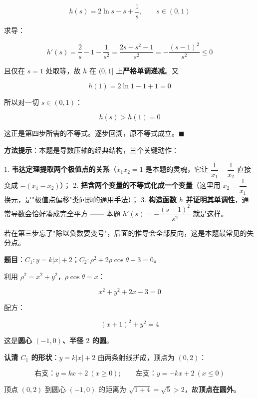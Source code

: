\[h(s)=2\ln s-s+\frac1s,\qquad s\in(0,1)\]

求导：

\[h'(s)=\frac2s-1-\frac1{s^{2}}=\frac{2s-s^{2}-1}{s^{2}}=-\frac{(s-1)^{2}}{s^{2}}\le0\]

且仅在 $s=1$ 处取等，故 $h$ 在 $(0,1]$ 上\textbf{严格单调递减}。又

\[h(1)=2\ln1-1+1=0\]

所以对一切 $s\in(0,1)$：

\[h(s)>h(1)=0\]

这正是第四步所需的不等式。逐步回溯，原不等式成立。$\blacksquare$

\begin{gktip}
\textbf{方法提示}：本题是导数压轴的经典结构，三个关键动作：

1. \textbf{韦达定理提取两个极值点的关系}（$x_1x_2=1$ 是本题的灵魂，它让 $\dfrac1{x_1}-\dfrac1{x_2}$ 直接变成 $-\left(x_1-x_2\right)$）；
2. \textbf{把含两个变量的不等式化成一个变量}（这里用 $x_2=\dfrac1{x_1}$ 换元，是"极值点偏移"类问题的通用手法）；
3. \textbf{构造函数 $h$ 并证明其单调性}，通常导数会恰好凑成完全平方 —— 本题 $h'(s)=-\dfrac{(s-1)^{2}}{s^{2}}$ 就是这样。

若在第三步忘了"除以负数要变号"，后面的推导会全部反向，这是本题最常见的失分点。
\end{gktip}

\par\medskip



\textbf{题目}：$C_1:y=k|x|+2$；$C_2:\rho^{2}+2\rho\cos\theta-3=0$。


利用 $\rho^{2}=x^{2}+y^{2}$，$\rho\cos\theta=x$：

\[x^{2}+y^{2}+2x-3=0\]

配方：

\[(x+1)^{2}+y^{2}=4\]

这是\textbf{圆心 $(-1,0)$、半径 $2$ 的圆}。


\textbf{认清 $C_1$ 的形状}：$y=k|x|+2$ 由两条射线拼成，顶点为 $(0,2)$：

\[\text{右支：}y=kx+2\ (x\ge0);\qquad \text{左支：}y=-kx+2\ (x\le0)\]

顶点 $(0,2)$ 到圆心 $(-1,0)$ 的距离为 $\sqrt{1+4}=\sqrt5>2$，故\textbf{顶点在圆外}。

